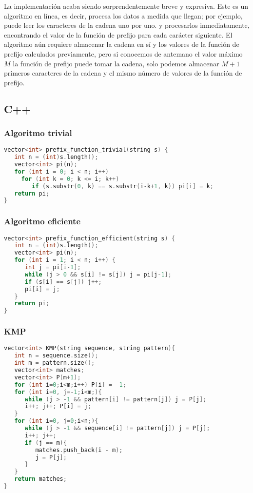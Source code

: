 La implementación acaba siendo sorprendentemente breve y expresiva. Este es un algoritmo en línea, es decir, procesa los datos a medida que llegan; por ejemplo, puede leer los caracteres de la cadena uno por uno. y procesarlos inmediatamente, encontrando el valor de la función de prefijo para cada carácter siguiente. El algoritmo aún requiere almacenar la
cadena en sí y los valores de la función de prefijo calculados previamente, pero si conocemos de antemano el valor máximo $M$ la función de prefijo puede tomar la cadena, solo podemos almacenar $M + 1$ primeros caracteres de la cadena y el mismo número de valores de la función de prefijo.

\subsection{C++}

\subsubsection{Algoritmo trivial}
\begin{lstlisting}[language=C++]
vector<int> prefix_function_trivial(string s) {
   int n = (int)s.length();
   vector<int> pi(n);
   for (int i = 0; i < n; i++)
     for (int k = 0; k <= i; k++)
        if (s.substr(0, k) == s.substr(i-k+1, k)) pi[i] = k;
   return pi;
}
\end{lstlisting}

\subsubsection{Algoritmo eficiente} 
\begin{lstlisting}[language=C++]
vector<int> prefix_function_efficient(string s) {
   int n = (int)s.length();
   vector<int> pi(n);
   for (int i = 1; i < n; i++) {
      int j = pi[i-1];
      while (j > 0 && s[i] != s[j]) j = pi[j-1];
      if (s[i] == s[j]) j++;
      pi[i] = j;
   }
   return pi;
}
\end{lstlisting}

\subsubsection{KMP} 
\begin{lstlisting}[language=C++]
vector<int> KMP(string sequence, string pattern){
   int n = sequence.size();
   int m = pattern.size();
   vector<int> matches;
   vector<int> P(m+1);
   for (int i=0;i<m;i++) P[i] = -1;
   for (int i=0, j=-1;i<m;){
      while (j > -1 && pattern[i] != pattern[j]) j = P[j];
      i++; j++; P[i] = j;
   }
   for (int i=0, j=0;i<n;){
      while (j > -1 && sequence[i] != pattern[j]) j = P[j];
      i++; j++;
      if (j == m){
         matches.push_back(i - m);
         j = P[j];
      }
   }
   return matches;
}
\end{lstlisting}


